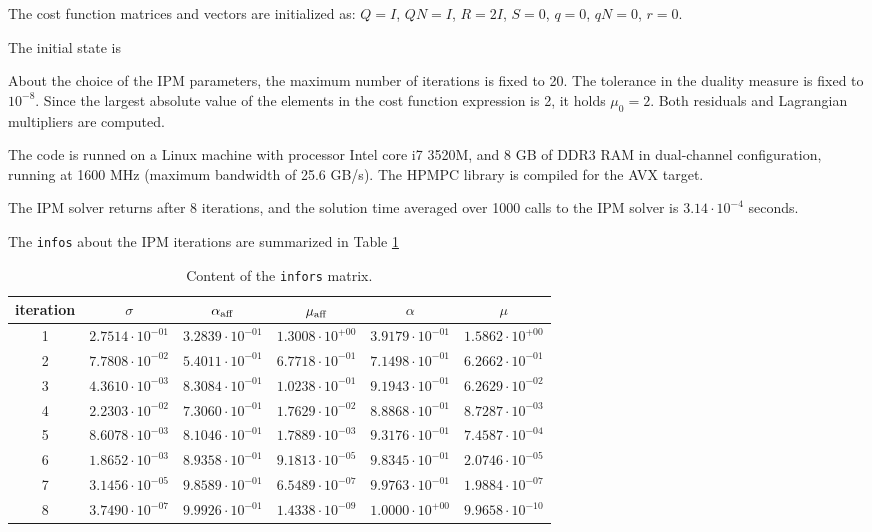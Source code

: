 \documentclass[a4paper]{report}
\begin{document}
The cost function matrices and vectors are initialized as: $Q=I$, $QN=I$, $R=2I$, $S=0$, $q=0$, $qN=0$, $r=0$. 

The initial state is 

About the choice of the IPM parameters, the maximum number of iterations is fixed to 20.
The tolerance in the duality measure is fixed to $10^{-8}$.
Since the largest absolute value of the elements in the cost function expression is 2, it holds $\mu_0=2$.
Both residuals and Lagrangian multipliers are computed.

The code is runned on a Linux machine with processor Intel core i7 3520M, and 8 GB of DDR3 RAM in dual-channel configuration, running at 1600 MHz (maximum bandwidth of 25.6 GB/s).
The HPMPC library is compiled for the AVX target.

The IPM solver returns after 8 iterations, and the solution time averaged over 1000 calls to the IPM solver is $3.14\cdot 10^{-4}$ seconds.

The {\tt infos} about the IPM iterations are summarized in Table \ref{tab:infos}
\begin{table}
\centering
\caption{Content of the {\tt infors} matrix.}
\label{tab:infos}
\begin{tabular}{c|ccccc}
iteration & $\sigma$ & $\alpha_{\rm aff}$ & $\mu_{\rm aff}$ & $\alpha$ & $\mu$ \\ 
\hline
1 &   $2.7514\cdot 10^{-01}$ &  $3.2839\cdot 10^{-01}$ &  $1.3008\cdot 10^{+00}$ &  $3.9179\cdot 10^{-01}$ &  $1.5862\cdot 10^{+00}$ \\
2 &   $7.7808\cdot 10^{-02}$ &  $5.4011\cdot 10^{-01}$ &  $6.7718\cdot 10^{-01}$ &  $7.1498\cdot 10^{-01}$ &  $6.2662\cdot 10^{-01}$ \\
3 &   $4.3610\cdot 10^{-03}$ &  $8.3084\cdot 10^{-01}$ &  $1.0238\cdot 10^{-01}$ &  $9.1943\cdot 10^{-01}$ &  $6.2629\cdot 10^{-02}$ \\
4 &   $2.2303\cdot 10^{-02}$ &  $7.3060\cdot 10^{-01}$ &  $1.7629\cdot 10^{-02}$ &  $8.8868\cdot 10^{-01}$ &  $8.7287\cdot 10^{-03}$ \\
5 &   $8.6078\cdot 10^{-03}$ &  $8.1046\cdot 10^{-01}$ &  $1.7889\cdot 10^{-03}$ &  $9.3176\cdot 10^{-01}$ &  $7.4587\cdot 10^{-04}$ \\
6 &   $1.8652\cdot 10^{-03}$ &  $8.9358\cdot 10^{-01}$ &  $9.1813\cdot 10^{-05}$ &  $9.8345\cdot 10^{-01}$ &  $2.0746\cdot 10^{-05}$ \\
7 &   $3.1456\cdot 10^{-05}$ &  $9.8589\cdot 10^{-01}$ &  $6.5489\cdot 10^{-07}$ &  $9.9763\cdot 10^{-01}$ &  $1.9884\cdot 10^{-07}$ \\
8 &   $3.7490\cdot 10^{-07}$ &  $9.9926\cdot 10^{-01}$ &  $1.4338\cdot 10^{-09}$ &  $1.0000\cdot 10^{+00}$ &  $9.9658\cdot 10^{-10}$ \\
\end{tabular}
\end{table}
\end{document}
